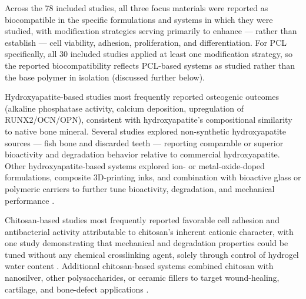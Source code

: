 \documentclass[5p,times,twocolumn]{elsarticle}
\begin{document}
Across the 78 included studies, all three focus materials were reported as biocompatible in the specific formulations and systems in which they were studied, with modification strategies serving primarily to enhance --- rather than establish --- cell viability, adhesion, proliferation, and differentiation. For PCL specifically, all 30 included studies applied at least one modification strategy, so the reported biocompatibility reflects PCL-based systems as studied rather than the base polymer in isolation (discussed further below).

Hydroxyapatite-based studies most frequently reported osteogenic outcomes (alkaline phosphatase activity, calcium deposition, upregulation of RUNX2/OCN/OPN), consistent with hydroxyapatite's compositional similarity to native bone mineral. Several studies explored non-synthetic hydroxyapatite sources --- fish bone \cite{ref70} and discarded teeth \cite{ref32} --- reporting comparable or superior bioactivity and degradation behavior relative to commercial hydroxyapatite. Other hydroxyapatite-based systems explored ion- or metal-oxide-doped formulations, composite 3D-printing inks, and combination with bioactive glass or polymeric carriers to further tune bioactivity, degradation, and mechanical performance \cite{ref2,ref41,ref48,ref52,ref66,ref69}.

Chitosan-based studies most frequently reported favorable cell adhesion and antibacterial activity attributable to chitosan's inherent cationic character, with one study demonstrating that mechanical and degradation properties could be tuned without any chemical crosslinking agent, solely through control of hydrogel water content \cite{ref51}. Additional chitosan-based systems combined chitosan with nanosilver, other polysaccharides, or ceramic fillers to target wound-healing, cartilage, and bone-defect applications \cite{ref13,ref14,ref20,ref23,ref56,ref58}.
\end{document}
